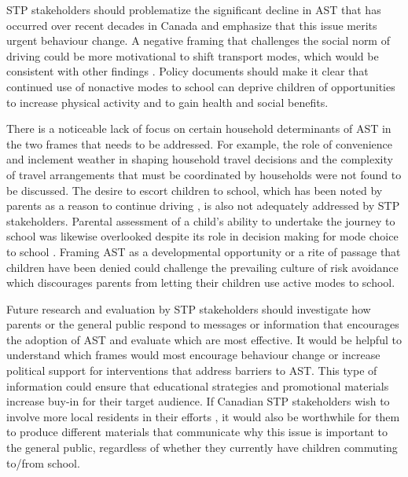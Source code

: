 \documentclass[preprint, 3p,
authoryear]{elsarticle} %
\begin{document}
STP stakeholders should problematize the significant decline in AST that
has occurred over recent decades in Canada and emphasize that this issue
merits urgent behaviour change. A negative framing that challenges the
social norm of driving could be more motivational to shift transport
modes, which would be consistent with other findings
\citep[see][]{waygoodCO2ValenceFraming2018}. Policy documents should
make it clear that continued use of nonactive modes to school can
deprive children of opportunities to increase physical activity and to
gain health and social benefits.

There is a noticeable lack of focus on certain household determinants of
AST in the two frames that needs to be addressed. For example, the role
of convenience and inclement weather in shaping household travel
decisions \citep{buliungSchoolTravelPlanning2011} and the complexity of
travel arrangements that must be coordinated by households
\citep[see][]{buliungLivingJourneySchool2021} were not found to be
discussed. The desire to escort children to school, which has been noted
by parents as a reason to continue driving
\citep{westmanWhatDrivesThem2017}, is also not adequately addressed by
STP stakeholders. Parental assessment of a child's ability to undertake
the journey to school was likewise overlooked despite its role in
decision making for mode choice to school
\citep{faulknerWhatQuickestEasiest2010}. Framing AST as a developmental
opportunity or a rite of passage that children have been denied could
challenge the prevailing culture of risk avoidance which discourages
parents from letting their children use active modes to school.

Future research and evaluation by STP stakeholders should investigate
how parents or the general public respond to messages or information
that encourages the adoption of AST and evaluate which are most
effective. It would be helpful to understand which frames would most
encourage behaviour change or increase political support for
interventions that address barriers to AST. This type of information
could ensure that educational strategies and promotional materials
increase buy-in for their target audience. If Canadian STP stakeholders
wish to involve more local residents in their efforts
\citep{buttazzoniSupportingActiveSchool2018}, it would also be
worthwhile for them to produce different materials that communicate why
this issue is important to the general public, regardless of whether
they currently have children commuting to/from school.
\end{document}

